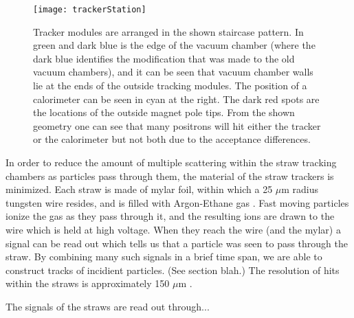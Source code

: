 \begin{figure}[]
    \centering
    \texttt{[image: trackerStation]}
    \caption[Tracker module arrangement]{Tracker modules are arranged in the shown staircase pattern. In green and dark blue is the edge of the vacuum chamber (where the dark blue identifies the modification that was made to the old vacuum chambers), and it can be seen that vacuum chamber walls lie at the ends of the outside tracking modules. The position of a calorimeter can be seen in cyan at the right. The dark red spots are the locations of the outside magnet pole tips. From the shown geometry one can see that many positrons will hit either the tracker or the calorimeter but not both due to the acceptance differences.}
    \label{fig:staircase}
\end{figure}

In order to reduce the amount of multiple scattering within the straw tracking chambers as particles pass through them, the material of the straw trackers is minimized. Each straw is made of mylar foil, within which a 25 $\mu$m radius tungsten wire resides, and is filled with Argon-Ethane gas \cite{something}. Fast moving particles ionize the gas as they pass through it, and the resulting ions are drawn to the wire which is held at high voltage. When they reach the wire (and the mylar) a signal can be read out which tells us that a particle was seen to pass through the straw. By combining many such signals in a brief time span, we are able to construct tracks of incidient particles. (See section blah.) The resolution of hits within the straws is approximately 150 $\mu$m \cite{something}.

The signals of the straws are read out through...

